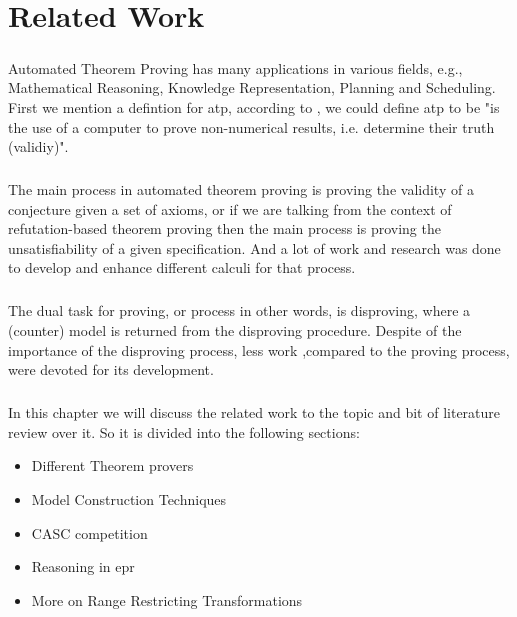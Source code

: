 \chapter{Related Work}\label{chap:rel_work}
\paragraph{}
Automated Theorem Proving has many applications in various fields, e.g., Mathematical Reasoning, Knowledge Representation, Planning and Scheduling. First we mention a defintion for \ac{atp}, according to \cite{ATP84}, we could define \ac{atp} to be "is the use of a computer to prove non-numerical results, i.e. determine their truth (validiy)".  

\paragraph{}
The main process in automated theorem proving is proving the validity of a conjecture given a set of axioms, or if we are talking from the context of refutation-based theorem proving then the main process is proving the unsatisfiability of a given specification. And a lot of work and research was done to develop and enhance different calculi for that process.  

\paragraph{}
The dual task for proving, or process in other words, is disproving, where a (counter) model is returned from the disproving procedure. Despite of the importance of the disproving process, less work ,compared to the proving process, were devoted for its development.

\paragraph{}
In this chapter we will discuss the related work to the topic and bit of literature review over it. So it is divided into the following sections:
	\begin{itemize}
		\item Different Theorem provers
		\item Model Construction Techniques
		\item CASC competition
		\item Reasoning in \ac{epr}
		\item More on Range Restricting Transformations
	\end{itemize}



